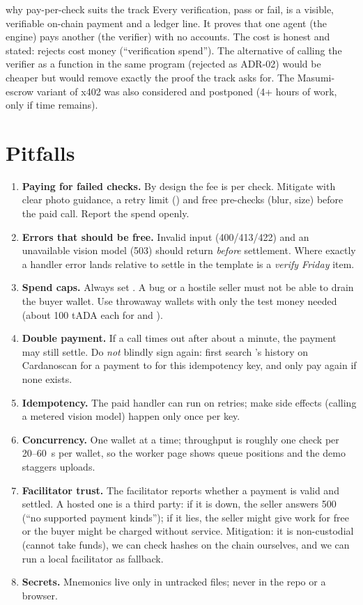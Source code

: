 \begin{shelfiebox}{why pay-per-check suits the track}
Every verification, pass or fail, is a visible, verifiable on-chain payment and a ledger line. It proves that one agent (the engine) pays another (the verifier) with no accounts. The cost is honest and stated: rejects cost money (``verification spend''). The alternative of calling the verifier as a function in the same program (rejected as ADR-02) would be cheaper but would remove exactly the proof the track asks for. The Masumi-escrow variant of x402 was also considered and postponed (4+ hours of work, only if time remains).
\end{shelfiebox}

\section{Pitfalls}
\begin{enumerate}
  \item \textbf{Paying for failed checks.} By design the fee is per check. Mitigate with clear photo guidance, a retry limit () and free pre-checks (blur, size) before the paid call. Report the spend openly.
  \item \textbf{Errors that should be free.} Invalid input (400/413/422) and an unavailable vision model (503) should return \emph{before} settlement. Where exactly a handler error lands relative to settle in the template is a \emph{verify Friday} item.
  \item \textbf{Spend caps.} Always set . A bug or a hostile seller must not be able to drain the buyer wallet. Use throwaway wallets with only the test money needed (about 100 tADA each for  and ).
  \item \textbf{Double payment.} If a call times out after about a minute, the payment may still settle. Do \emph{not} blindly sign again: first search 's history on Cardanoscan for a payment to  for this idempotency key, and only pay again if none exists.
  \item \textbf{Idempotency.} The paid handler can run on retries; make side effects (calling a metered vision model) happen only once per key.
  \item \textbf{Concurrency.} One wallet at a time; throughput is roughly one check per 20--60~s per wallet, so the worker page shows queue positions and the demo staggers uploads.
  \item \textbf{Facilitator trust.} The facilitator reports whether a payment is valid and settled. A hosted one is a third party: if it is down, the seller answers 500 (``no supported payment kinds''); if it lies, the seller might give work for free or the buyer might be charged without service. Mitigation: it is non-custodial (cannot take funds), we can check hashes on the chain ourselves, and we can run a local facilitator as fallback.
  \item \textbf{Secrets.} Mnemonics live only in untracked  files; never in the repo or a browser.
\end{enumerate}

